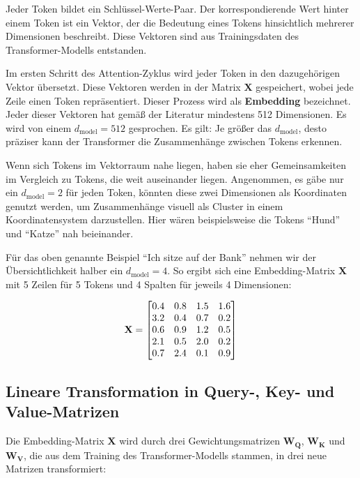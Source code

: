 Jeder Token bildet ein Schlüssel-Werte-Paar.  
Der korrespondierende Wert hinter einem Token ist ein Vektor, der die Bedeutung eines Tokens hinsichtlich mehrerer Dimensionen beschreibt.  
Diese Vektoren sind aus Trainingsdaten des Transformer-Modells entstanden.

Im ersten Schritt des Attention-Zyklus wird jeder Token in den dazugehörigen Vektor übersetzt.  
Diese Vektoren werden in der Matrix $\mathbf{X}$ gespeichert, wobei jede Zeile einen Token repräsentiert.  
Dieser Prozess wird als \textbf{Embedding} bezeichnet.  
Jeder dieser Vektoren hat gemäß der Literatur mindestens 512 Dimensionen.  
Es wird von einem \( d_{\text{model}} = 512 \) gesprochen.  
Es gilt: Je größer das \( d_{\text{model}} \), desto präziser kann der Transformer die Zusammenhänge zwischen Tokens erkennen.

Wenn sich Tokens im Vektorraum nahe liegen, haben sie eher Gemeinsamkeiten im Vergleich zu Tokens, die weit auseinander liegen.  
Angenommen, es gäbe nur ein \( d_{\text{model}} = 2 \) für jeden Token, könnten diese zwei Dimensionen als Koordinaten genutzt werden, um Zusammenhänge visuell als Cluster in einem Koordinatensystem darzustellen.  
Hier wären beispielsweise die Tokens \enquote{Hund} und \enquote{Katze} nah beieinander.

Für das oben genannte Beispiel \enquote{Ich sitze auf der Bank} nehmen wir der Übersichtlichkeit halber ein \( d_{\text{model}} = 4 \).  
So ergibt sich eine Embedding-Matrix $\mathbf{X}$ mit 5 Zeilen für 5 Tokens und 4 Spalten für jeweils 4 Dimensionen:

\[
\centering
\mathbf{X} =
\begin{bmatrix}
0.4 & 0.8 & 1.5 & 1.6 \\
3.2 & 0.4 & 0.7 & 0.2 \\
0.6 & 0.9 & 1.2 & 0.5 \\
2.1 & 0.5 & 2.0 & 0.2 \\
0.7 & 2.4 & 0.1 & 0.9
\end{bmatrix}
\]

\subsection{Lineare Transformation in Query-, Key- und Value-Matrizen}

Die Embedding-Matrix $\mathbf{X}$ wird durch drei Gewichtungsmatrizen $\mathbf{W_Q}$, $\mathbf{W_K}$ und $\mathbf{W_V}$, die aus dem Training des Transformer-Modells stammen, in drei neue Matrizen transformiert:

